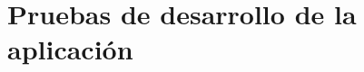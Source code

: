 \section{Pruebas de desarrollo de la aplicación}

  \begin{enumerate}
    
    
    
    
    
  \end{enumerate}